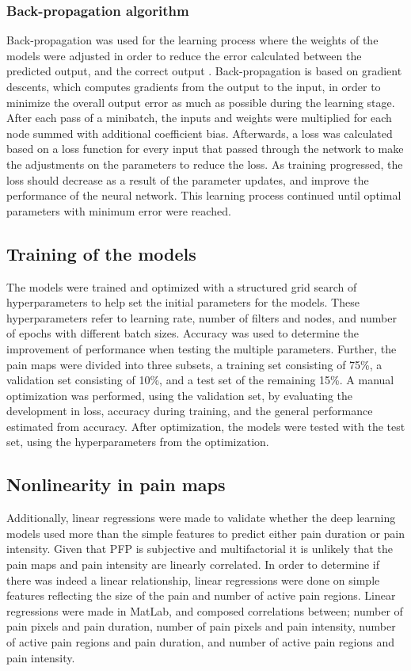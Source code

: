 \subsubsection{Back-propagation algorithm}
Back-propagation was used for the learning process where the weights of the models were adjusted in order to reduce the error calculated between the predicted output, and the correct output \citep{Duda2000}. Back-propagation is based on gradient descents, which computes gradients from the output to the input, in order to minimize the overall output error as much as possible during the learning stage. 
After each pass of a minibatch, the inputs and weights were multiplied for each node summed with additional coefficient bias.\citep{LeCun1998, Hameed2016}
Afterwards, a loss was calculated based on a loss function for every input that passed through the network to make the adjustments on the parameters to reduce the loss. As training progressed, the loss should decrease as a result of the parameter updates, and improve the performance of the neural network.\citep{Goodfellow2016, LeCun2015, Duda2000} This learning process continued until optimal parameters with minimum error were reached.\citep{Hameed2016}

\vspace{-0.2cm}
\subsection{Training of the models}
The models were trained and optimized with a structured grid search of hyperparameters to help set the initial parameters for the models. These hyperparameters refer to learning rate, number of filters and nodes, and number of epochs with different batch sizes. Accuracy was used to determine the improvement of performance when testing the multiple parameters.
Further, the pain maps were divided into three subsets, a training set consisting of 75\%, a validation set consisting of 10\%, and a test set of the remaining 15\%. A manual optimization was performed, using the validation set, by evaluating the development in loss, accuracy during training, and the general performance estimated from accuracy. After optimization, the models were tested with the test set, using the hyperparameters from the optimization.
 
 
\subsection{Nonlinearity in pain maps} 
Additionally, linear regressions were made to validate whether the deep learning models used more than the simple features to predict either pain duration or pain intensity.
Given that PFP is subjective and multifactorial it is unlikely that the pain maps and pain intensity are linearly correlated. In order to determine if there was indeed a linear relationship, linear regressions were done on simple features reflecting the size of the pain and number of active pain regions. Linear regressions were made in MatLab, and composed correlations between; number of pain pixels and pain duration, number of pain pixels and pain intensity, number of active pain regions and pain duration, and number of active pain regions and pain intensity.

